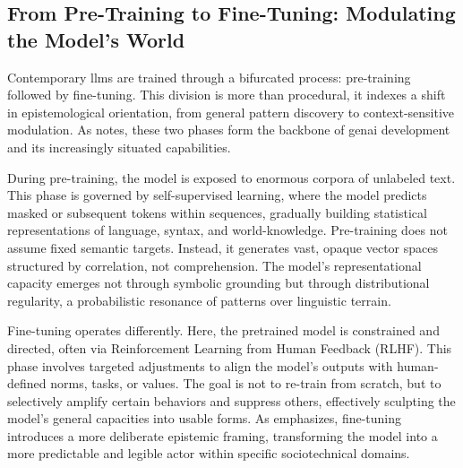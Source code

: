 %
%

\subsection{From Pre-Training to Fine-Tuning: Modulating the Model's
	World}\label{finetuning}

Contemporary \glspl{llm} are trained through a bifurcated process: pre-training followed by fine-tuning. This division is more than procedural, it indexes a shift in epistemological orientation, from general pattern discovery to context-sensitive modulation. As \textcite[964]{dishon2024} notes, these two phases form the backbone of \gls{genai} development and its increasingly situated capabilities.

During pre-training, the model is exposed to enormous corpora of unlabeled text. This phase is governed by self-supervised learning, where the model predicts masked or subsequent \gls{tokens} within sequences, gradually building statistical representations of language, syntax, and world-knowledge. Pre-training does not assume fixed semantic targets. Instead, it generates vast, opaque vector spaces structured by correlation, not comprehension. The model's representational capacity emerges not through symbolic grounding but through distributional regularity, a probabilistic resonance of patterns over linguistic terrain.

Fine-tuning operates differently. Here, the pretrained model is constrained and directed, often via Reinforcement Learning from Human Feedback (RLHF). This phase involves targeted adjustments to align the model's outputs with human-defined norms, tasks, or values. The goal is not to re-train from scratch, but to selectively amplify certain behaviors and suppress others, effectively sculpting the model’s general capacities into usable forms. As \textcite[964]{dishon2024} emphasizes, fine-tuning introduces a more deliberate epistemic framing, transforming the model into a more predictable and legible actor within specific sociotechnical domains.

